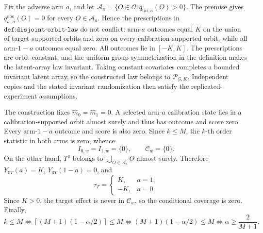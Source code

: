 Fix the adverse arm \(a\), and let \(\mathcal A_a=\{O\in\mathcal O:q_{\mathrm{tar},a}(O)>0\}\). The premise gives \(q^{\mathrm{obs}}_{w,a}(O)=0\) for every \(O\in\mathcal A_a\). Hence the prescriptions in \(\texttt{def:disjoint-orbit-law}\) do not conflict: arm-\(a\) outcomes equal \(K\) on the union of target-supported orbits and zero on every calibration-supported orbit, while all arm-\(1-a\) outcomes equal zero. All outcomes lie in \([-K,K]\). The prescriptions are orbit-constant, and the uniform group symmetrization in the definition makes the latent-array law invariant. Taking constant covariates completes a bounded invariant latent array, so the constructed law belongs to \(\mathcal P_{\mathcal G,K}\). Independent copies and the stated invariant randomization then satisfy the replicated-experiment assumptions.

The construction fixes \(\widehat m_0=\widehat m_1=0\). A selected arm-\(a\) calibration state lies in a calibration-supported orbit almost surely and thus has outcome and score zero. Every arm-\(1-a\) outcome and score is also zero. Since \(k\le M\), the \(k\)-th order statistic in both arms is zero, whence \[I_{0,w}=I_{1,w}=\{0\},\qquad\mathcal C_w=\{0\}.\] On the other hand, \(T^a\) belongs to \(\bigcup_{O\in\mathcal A_a}O\) almost surely. Therefore \(Y_{0T}(a)=K\), \(Y_{0T}(1-a)=0\), and \[\tau_T=\begin{cases}K,&a=1,\\-K,&a=0.\end{cases}\] Since \(K>0\), the target effect is never in \(\mathcal C_w\), so the conditional coverage is zero. Finally, \[k\le M\iff\left\lceil(M+1)(1-\alpha/2)\right\rceil\le M\iff(M+1)(1-\alpha/2)\le M\iff\alpha\ge\frac{2}{M+1}.\]